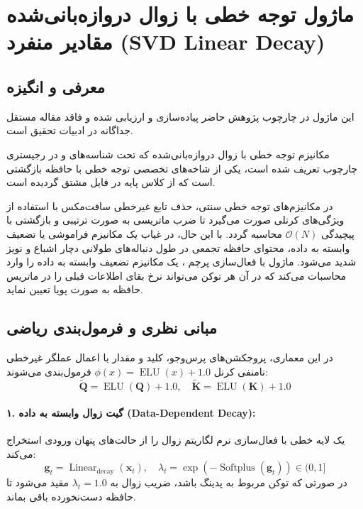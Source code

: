 \section{ماژول توجه خطی با زوال دروازه‌بانی‌شده مقادیر منفرد (SVD Linear Decay)}
\label{sec:module_svd_linear_decay}

\subsection{معرفی و انگیزه}
این ماژول در چارچوب پژوهش حاضر پیاده‌سازی و ارزیابی شده و فاقد مقاله مستقل جداگانه در ادبیات تحقیق است.

مکانیزم توجه خطی با زوال دروازه‌بانی‌شده  که تحت شناسه‌های  و  در رجیستری چارچوب تعریف شده است، یکی از شاخه‌های تخصصی توجه خطی با حافظه بازگشتی است که از کلاس پایه  در فایل  مشتق گردیده است.

در مکانیزم‌های توجه خطی سنتی، حذف تابع غیرخطی سافت‌مکس با استفاده از ویژگی‌های کرنلی صورت می‌گیرد تا ضرب ماتریسی به صورت ترتیبی و بازگشتی با پیچیدگی $\mathcal{O}(N)$ محاسبه گردد. با این حال، در غیاب یک مکانیزم فراموشی یا تضعیف وابسته به داده، محتوای حافظه تجمعی در طول دنباله‌های طولانی دچار اشباع و نویز شدید می‌شود. ماژول  با فعال‌سازی پرچم ، یک مکانیزم تضعیف وابسته به داده  را وارد محاسبات می‌کند که در آن هر توکن می‌تواند نرخ بقای اطلاعات قبلی را در ماتریس حافظه به صورت پویا تعیین نماید.

\subsection{مبانی نظری و فرمول‌بندی ریاضی}
در این معماری، پروجکشن‌های پرس‌وجو، کلید و مقدار با اعمال عملگر غیرخطی نامنفی کرنل $\phi(x) = \operatorname{ELU}(x) + 1.0$ فرمول‌بندی می‌شوند:
\begin{equation}
\tilde{\mathbf{Q}} = \operatorname{ELU}(\mathbf{Q}) + 1.0, \quad \tilde{\mathbf{K}} = \operatorname{ELU}(\mathbf{K}) + 1.0
\end{equation}

\paragraph{۱. گیت زوال وابسته به داده (Data-Dependent Decay):}
یک لایه خطی با فعال‌سازی نرم  لگاریتم زوال را از حالت‌های پنهان ورودی استخراج می‌کند:
\begin{equation}
\mathbf{g}_t = \operatorname{Linear}_{\text{decay}}(\mathbf{x}_t), \quad \lambda_t = \exp\left(-\operatorname{Softplus}(\mathbf{g}_t)\right) \in (0, 1]
\end{equation}
در صورتی که توکن مربوط به پدینگ باشد، ضریب زوال به $\lambda_t = 1.0$ مقید می‌شود تا حافظه دست‌نخورده باقی بماند.

